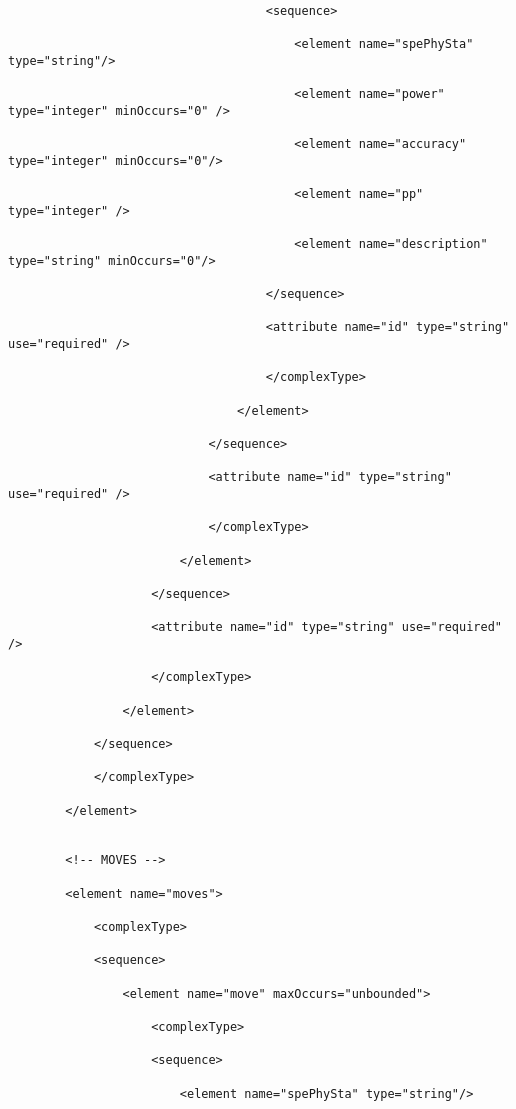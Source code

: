 \begin{lstlisting}
                                    <sequence>

                                        <element name="spePhySta" type="string"/>

                                        <element name="power" type="integer" minOccurs="0" />

                                        <element name="accuracy" type="integer" minOccurs="0"/>

                                        <element name="pp" type="integer" />

                                        <element name="description" type="string" minOccurs="0"/>

                                    </sequence>

                                    <attribute name="id" type="string" use="required" />

                                    </complexType>

                                </element>

                            </sequence>

                            <attribute name="id" type="string" use="required" />

                            </complexType>

                        </element>

                    </sequence>

                    <attribute name="id" type="string" use="required" />

                    </complexType>

                </element>

            </sequence>

            </complexType>

        </element>


        <!-- MOVES -->

        <element name="moves">

            <complexType>

            <sequence>

                <element name="move" maxOccurs="unbounded">

                    <complexType>

                    <sequence>

                        <element name="spePhySta" type="string"/>


\end{lstlisting}
